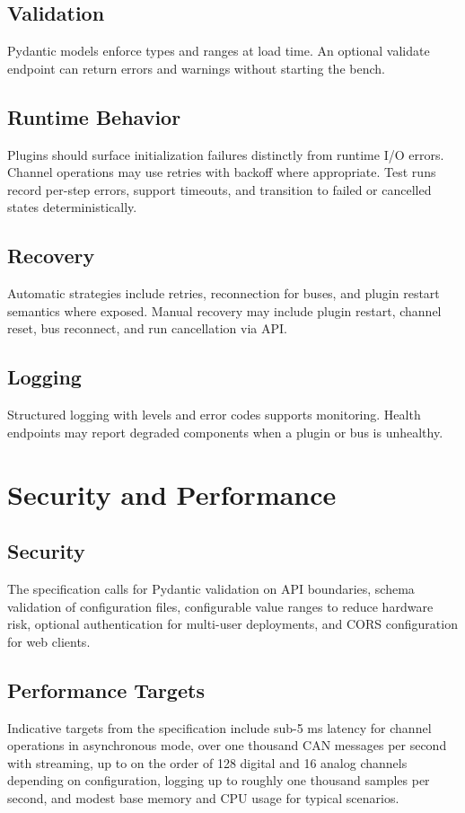 \documentclass[conference]{IEEEtran}
\begin{document}
\subsection{Validation}
Pydantic models enforce types and ranges at load time. An optional validate endpoint can return errors and warnings without starting the bench.

\subsection{Runtime Behavior}
Plugins should surface initialization failures distinctly from runtime I/O errors. Channel operations may use retries with backoff where appropriate. Test runs record per-step errors, support timeouts, and transition to failed or cancelled states deterministically.

\subsection{Recovery}
Automatic strategies include retries, reconnection for buses, and plugin restart semantics where exposed. Manual recovery may include plugin restart, channel reset, bus reconnect, and run cancellation via API.

\subsection{Logging}
Structured logging with levels and error codes supports monitoring. Health endpoints may report degraded components when a plugin or bus is unhealthy.

\section{Security and Performance}

\subsection{Security}
The specification calls for Pydantic validation on API boundaries, schema validation of configuration files, configurable value ranges to reduce hardware risk, optional authentication for multi-user deployments, and CORS configuration for web clients.

\subsection{Performance Targets}
Indicative targets from the specification include sub-5 ms latency for channel operations in asynchronous mode, over one thousand CAN messages per second with streaming, up to on the order of 128 digital and 16 analog channels depending on configuration, logging up to roughly one thousand samples per second, and modest base memory and CPU usage for typical scenarios.
\end{document}
